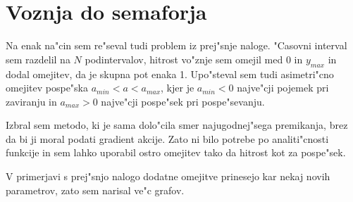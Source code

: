 \documentclass[a4paper,10pt]{article}
\begin{document}
\section{Voznja do semaforja}
Na enak na"cin sem re"seval tudi problem iz prej"snje naloge. "Casovni interval sem razdelil na $N$ podintervalov, hitrost vo"znje sem omejil med 0 in $y_{max}$ in dodal omejitev, da je skupna pot enaka 1. Upo"steval sem tudi asimetri"cno omejitev pospe"ska $a_{min} < a < a_{max}$, kjer je $a_{min}<0$ najve"cji pojemek pri zaviranju in $a_{max} > 0$ najve"cji pospe"sek pri pospe"sevanju. 

Izbral sem metodo, ki je sama dolo"cila smer najugodnej"sega premikanja, brez da bi ji moral podati gradient akcije. Zato ni bilo potrebe po analiti"cnosti funkcije in sem lahko uporabil ostro omejitev tako da hitrost kot za pospe"sek. 

V primerjavi s prej"snjo nalogo dodatne omejitve prinesejo kar nekaj novih parametrov, zato sem narisal ve"c grafov. 
\end{document}
